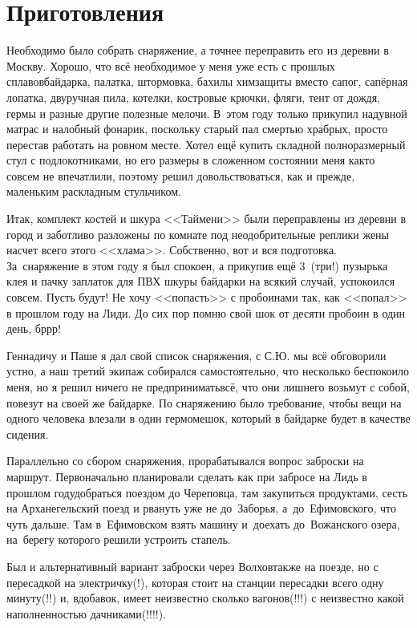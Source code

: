 \chapter{Приготовления} 
\vepsianrose

Необходимо было собрать снаряжение, а точнее переправить его из деревни в Москву. Хорошо, что всё необходимое у меня уже есть с прошлых сплавов\mdash  байдарка, палатка, штормовка, бахилы химзащиты вместо сапог, сапёрная лопатка, двуручная пила, котелки, костровые крючки, фляги, тент от дождя, гермы и разные другие полезные мелочи. В~этом году только прикупил надувной матрас и налобный фонарик, поскольку старый пал смертью храбрых, просто перестав работать на ровном месте. Хотел ещё купить складной полноразмерный стул с подлокотниками, но его размеры в сложенном состоянии меня как\sdash то совсем не впечатлили, поэтому решил довольствоваться, как и прежде, маленьким раскладным стульчиком.

Итак, комплект костей и шкура <<Таймени>> были переправлены из деревни в город и заботливо разложены по комнате под неодобрительные реплики жены насчет всего этого <<хлама>>. Собственно, вот и вся подготовка. За~снаряжение в этом году я был спокоен, а прикупив ещё 3~(три!) пузырька клея и пачку заплаток для ПВХ шкуры байдарки на всякий случай, успокоился совсем. Пусть будут! Не хочу <<попасть>> с пробоинами так, как <<попал>> в прошлом году на Лиди. До сих пор помню свой шок от десяти пробоин в один день, бр\sdash р\sdash р!

Геннадичу и Паше я дал свой список снаряжения, с С.Ю. мы всё обговорили устно, а наш третий экипаж собирался самостоятельно, что несколько беспокоило меня, но я решил ничего не предпринимать\mdash всё, что они лишнего возьмут с собой, повезут на своей же байдарке. По снаряжению было требование, чтобы вещи на одного человека влезали в один гермомешок, который в байдарке будет в качестве сидения.

Параллельно со сбором снаряжения, прорабатывался вопрос заброски на маршрут. Первоначально планировали сделать как при забросе на Лидь в прошлом году\mdash добраться поездом до Череповца, там закупиться продуктами, сесть на Арханегельский поезд и рвануть уже не до~Заборья, а~до~Ефимовского, что чуть дальше. Там в~Ефимовском взять машину и~доехать до~Вожанского озера, на~берегу которого решили устроить стапель. 

Был и альтернативный вариант заброски через Волхов\mdash также на поезде, но с пересадкой на электричку(!), которая стоит на станции пересадки всего одну минуту(!!) и, вдобавок, имеет неизвестно сколько вагонов(!!!) с неизвестно какой наполненностью дачниками(!!!!). 

